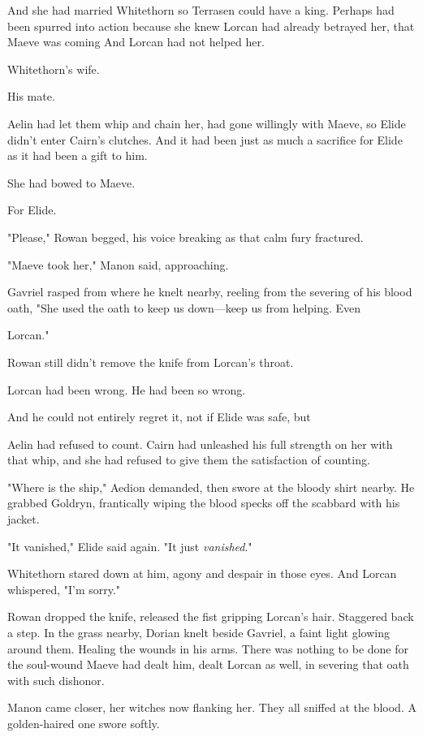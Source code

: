 And she had married Whitethorn  so Terrasen could have a king. Perhaps had been spurred into action because she knew Lorcan had already betrayed her, that Maeve was coming  And Lorcan had not helped her.

Whitethorn's wife.

His mate.

Aelin had let them whip and chain her, had gone willingly with Maeve, so Elide didn't enter Cairn's clutches. And it had been just as much a sacrifice for Elide as it had been a gift to him.

She had bowed to Maeve.

For Elide.

"Please," Rowan begged, his voice breaking as that calm fury fractured.

"Maeve took her," Manon said, approaching.

Gavriel rasped from where he knelt nearby, reeling from the severing of his blood oath, "She used the oath to keep us down---keep us from helping. Even

Lorcan."

Rowan still didn't remove the knife from Lorcan's throat.

Lorcan had been wrong. He had been so wrong.

And he could not entirely regret it, not if Elide was safe, but 

Aelin had refused to count. Cairn had unleashed his full strength on her with that whip, and she had refused to give them the satisfaction of counting.

"Where is the ship," Aedion demanded, then swore at the bloody shirt nearby. He grabbed Goldryn, frantically wiping the blood specks off the scabbard with his jacket.

"It vanished," Elide said again. "It just  \emph{vanished}."

Whitethorn stared down at him, agony and despair in those eyes. And Lorcan whispered, "I'm sorry."

Rowan dropped the knife, released the fist gripping Lorcan's hair. Staggered back a step. In the grass nearby, Dorian knelt beside Gavriel, a faint light glowing around them. Healing the wounds in his arms. There was nothing to be done for the soul-wound Maeve had dealt him, dealt Lorcan as well, in severing that oath with such dishonor.

Manon came closer, her witches now flanking her. They all sniffed at the blood. A golden-haired one swore softly.

